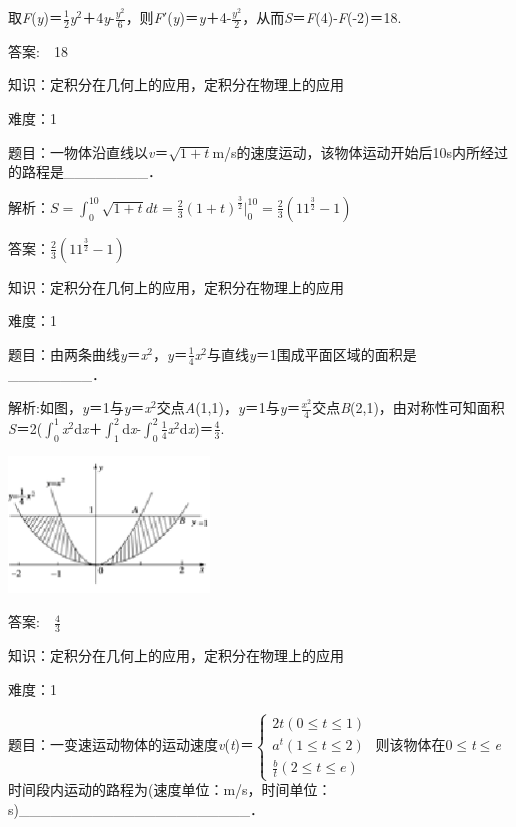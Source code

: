 \documentclass{article} %
\begin{document}
取\textit{F}(\textit{y})＝$\frac{1}{2}$\textit{y}${}^{2}$＋4\textit{y}-$\frac{y^2}{6}$，则\textit{F}$\mathrm{\prime}$(\textit{y})＝\textit{y}＋4-$\frac{y^2}{2}$，从而\textit{S}＝\textit{F}(4)-\textit{F}(-2)＝18.

 答案:　18



 知识：定积分在几何上的应用，定积分在物理上的应用

 难度：1

 题目：一物体沿直线以\textit{v}＝$\sqrt{1+t}$m/s的速度运动，该物体运动开始后10s内所经过的路程是\_\_\_\_\_\_\_\_．

解析：$S=\int_{0}^{10}\sqrt{1+t}dt=\frac{2}{3}(1+t)^{\frac{3}{2}}|_0^{10}=\frac{2}{3}(11^{\frac{3}{2}}-1)$

答案：$\frac{2}{3}(11^{\frac{3}{2}}-1)$

 知识：定积分在几何上的应用，定积分在物理上的应用

 难度：1

 题目：由两条曲线\textit{y}＝\textit{x}${}^{2}$，\textit{y}＝$\frac{1}{4}$\textit{x}${}^{2}$与直线\textit{y}＝1围成平面区域的面积是\_\_\_\_\_\_\_\_．

 解析:如图，\textit{y}＝1与\textit{y}＝\textit{x}${}^{2}$交点\textit{A}(1,1)，\textit{y}＝1与\textit{y}＝$\frac{x^2}{4}$交点\textit{B}(2,1)，由对称性可知面积\textit{S}＝2($\int_{0}^{1}$\textit{x}${}^{2}$d\textit{x}＋$\int_{1}^{2}$d\textit{x}-$\int_{0}^{2}\frac{1}{4}$\textit{x}${}^{2}$d\textit{x})＝$\frac{4}{3}$.

\includegraphics*[width=2.10in, height=1.44in, keepaspectratio=false]{image39}

 答案:　$\frac{4}{3}$

 知识：定积分在几何上的应用，定积分在物理上的应用

 难度：1

 题目：一变速运动物体的运动速度\textit{v}(\textit{t})＝$\left\{\begin{array}{r}2t(0\le t\le1)\\a^t(1\le t\le2)\\\frac{b}{t}(2\le t\le e)\end{array} \right.$
则该物体在0$\mathrm{\le}$\textit{t}$\mathrm{\le}$\textit{e}时间段内运动的路程为(速度单位：m/s，时间单位：s)\_\_\_\_\_\_\_\_\_\_\_\_\_\_\_\_\_\_\_\_\_\_．
\end{document}
